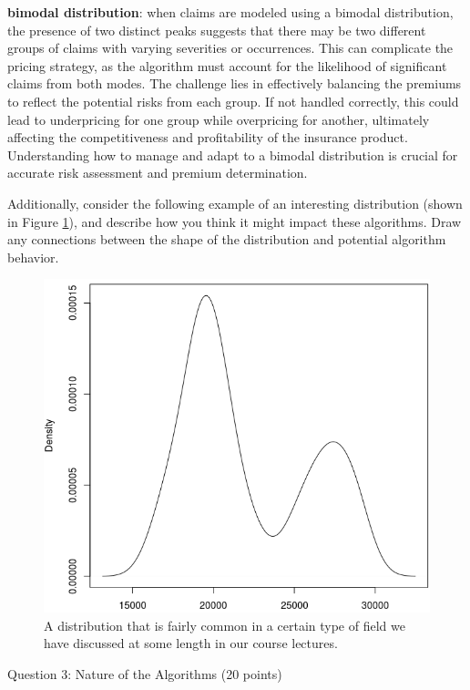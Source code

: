 \documentclass[12pt]{exam}
\begin{document}
\begin{questions}
\begin{itemize}
    \textbf{bimodal distribution}: when claims are modeled using a bimodal distribution, the presence of two distinct peaks suggests that there may be two different groups of claims with varying severities or occurrences. This can complicate the pricing strategy, as the algorithm must account for the likelihood of significant claims from both modes. The challenge lies in effectively balancing the premiums to reflect the potential risks from each group. If not handled correctly, this could lead to underpricing for one group while overpricing for another, ultimately affecting the competitiveness and profitability of the insurance product. Understanding how to manage and adapt to a bimodal distribution is crucial for accurate risk assessment and premium determination. \\

    
\end{itemize}

Additionally, consider the following example of an interesting distribution (shown in Figure \ref{fig:distribution}), and describe how you think it might impact these algorithms. Draw any connections between the shape of the distribution and potential algorithm behavior.


\begin{figure}[htbp] 
    \centering
    \includegraphics[width=0.75\linewidth]{interesting_distribution.png}
    \caption{A distribution that is fairly common in a certain type of field we have discussed at some length in our course lectures.}
    \label{fig:distribution}
\end{figure}



\question[20] Question 3: Nature of the Algorithms (20 points)


\end{questions}
\end{document}
